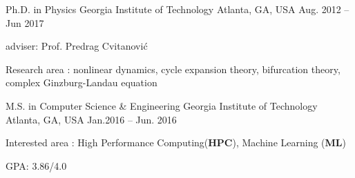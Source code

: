 


\begin{cventries}

\cveducation
{Ph.D. in Physics}
{Georgia Institute of Technology}
{Atlanta, GA, USA}
{Aug. 2012 -- Jun 2017}
{
  \begin{cvitems}
    \item adviser: Prof. Predrag Cvitanovi\'c
    \item Research area : nonlinear dynamics, cycle expansion theory, bifurcation theory,
      complex Ginzburg-Landau equation
  \end{cvitems}
}


\cveducation
{M.S. in Computer Science \& Engineering }
{Georgia Institute of Technology}
{Atlanta, GA, USA}
{Jan.2016 -- Jun. 2016}
{
  \begin{cvitems}
    \item Interested area : High Performance Computing(\textbf{HPC}), 
      Machine Learning (\textbf{ML})
    \item GPA: 3.86/4.0
  \end{cvitems}
}





\end{cventries}
